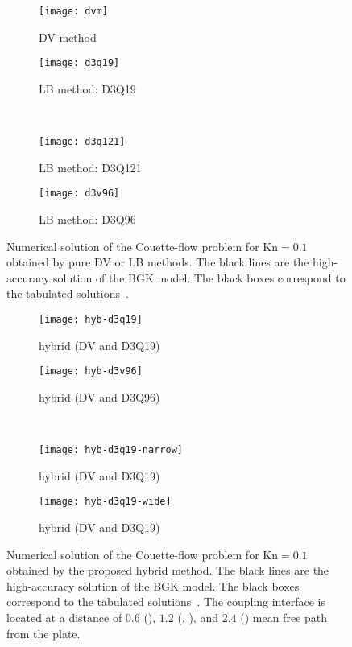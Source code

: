 \documentclass[]{elsarticle} %
\newcommand{\Kn}{\mathrm{Kn}}
\begin{document}
{\begin{figure}
    \centering
    \begin{subfigure}[b]{0.5\textwidth}
        \texttt{[image: dvm]}
        \caption{DV method}
        \label{fig:dvm}
    \end{subfigure}%
    \begin{subfigure}[b]{0.5\textwidth}
        \texttt{[image: d3q19]}
        \caption{LB method: D3Q19}
        \label{fig:d3q19}
    \end{subfigure}\\
    \begin{subfigure}[b]{0.5\textwidth}
        \texttt{[image: d3q121]}
        \caption{LB method: D3Q121}
        \label{fig:d3q121}
    \end{subfigure}%
    \begin{subfigure}[b]{0.5\textwidth}
        \texttt{[image: d3v96]}
        \caption{LB method: D3Q96}
        \label{fig:d3q96}
    \end{subfigure}
    \caption{
        Numerical solution of the Couette-flow problem for $\Kn=0.1$ obtained by pure DV or LB methods.
        The black lines are the high-accuracy solution of the BGK model.
        The black boxes correspond to the tabulated solutions~\cite{Luo2015, Luo2016}.
    }\label{fig:pure}
\end{figure}

\begin{figure}
    \centering
    \begin{subfigure}[b]{0.5\textwidth}
        \texttt{[image: hyb-d3q19]}
        \caption{hybrid (DV and D3Q19)}
        \label{fig:hyb:d3q19}
    \end{subfigure}%
    \begin{subfigure}[b]{0.5\textwidth}
        \texttt{[image: hyb-d3v96]}
        \caption{hybrid (DV and D3Q96)}
        \label{fig:hyb:d3q96}
    \end{subfigure}\\
    \begin{subfigure}[b]{0.5\textwidth}
        \texttt{[image: hyb-d3q19-narrow]}
        \caption{hybrid (DV and D3Q19)}
        \label{fig:hyb:d3q19-narrow}
    \end{subfigure}%
    \begin{subfigure}[b]{0.5\textwidth}
        \texttt{[image: hyb-d3q19-wide]}
        \caption{hybrid (DV and D3Q19)}
        \label{fig:hyb:d3q19-wide}
    \end{subfigure}
    \caption{
        Numerical solution of the Couette-flow problem for $\Kn=0.1$ obtained by the proposed hybrid method.
        The black lines are the high-accuracy solution of the BGK model.
        The black boxes correspond to the tabulated solutions~\cite{Luo2015, Luo2016}.
        The coupling interface is located at a distance of $0.6$ (),
        $1.2$ (, ),
        and $2.4$ () mean free path from the plate.
    }\label{fig:hybrid}
\end{figure}

}
\end{document}
